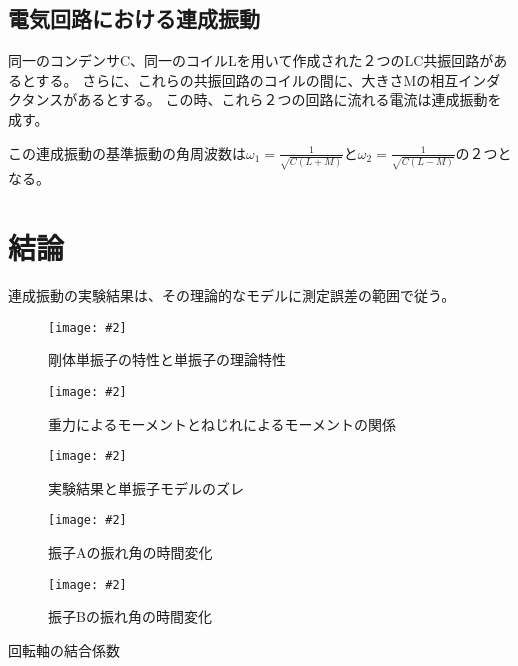 \documentclass[uplatex,11pt]{jsarticle}
\newcommand{\cir}[3]{ %
    \begin{figure}
        \begin{center}
            \texttt{[image: \#2]}
            \caption{#3}
            \label{fg_#1}
         \end{center}
    \end{figure}
}
\newcommand{\tab}[4]{ %
    \begin{table}[htb]
        \centering
        \caption{#3}
        
        \label{tab_#1}
    \end{table}
}
\begin{document}
\subsection{電気回路における連成振動}

同一のコンデンサC、同一のコイルLを用いて作成された２つのLC共振回路があるとする。
さらに、これらの共振回路のコイルの間に、大きさMの相互インダクタンスがあるとする。
この時、これら２つの回路に流れる電流は連成振動を成す。

この連成振動の基準振動の角周波数は$\omega_1 = \frac{1}{\sqrt{C(L+M)}}$と$\omega_2 = \frac{1}{\sqrt{C(L-M)}}$の２つとなる。

\section{結論}

連成振動の実験結果は、その理論的なモデルに測定誤差の範囲で従う。

\newpage

\cir{A-prime}{graph/a_with_model.png}{剛体単振子の特性と単振子の理論特性}
\cir{B-prime}{graph/b_with_regression.png}{重力によるモーメントとねじれによるモーメントの関係}
\cir{difference_from_model_A-prime}{graph/a_abs_error.png}{実験結果と単振子モデルのズレ}
\cir{f_theta_A}{graph/t_to_theta_A.png}{振子Aの振れ角の時間変化}
\cir{f_theta_B}{graph/t_to_theta_B.png}{振子Bの振れ角の時間変化}
\tab{B-prime}{csv/B.csv}{回転軸の結合係数}{3}
\end{document}
